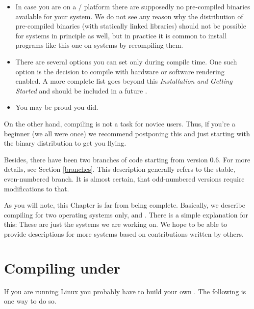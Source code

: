 \begin{itemize}
\item In case you are on a / platform there are supposedly no
pre-compiled binaries available for your system. We do not
see any reason why the distribution of pre-compiled binaries (with statically linked
libraries) should not be possible for  systems in principle as well, but in
practice it is common to install programs like this one on  systems by
recompiling them.

\item There are several options you can set only during
compile time. One such option is the decision to compile with
hardware or software  rendering enabled. A more
complete list goes beyond this \textit{Installation and Getting
Started} and should be included in a future
\textit{}.

\item You may be proud you did.
\end{itemize}

On the other hand, compiling \FlightGear is not a task for novice users. Thus, if you're
a beginner (we all were once) we recommend postponing this and just starting with the
binary distribution to get you flying.

Besides, there have been two branches of code starting from version 0.6. For more
details, see Section \ref{branches}. This description generally refers to the stable,
even-numbered branch. It is almost certain, that odd-numbered versions require
modifications to that.

As you will note, this Chapter is far from being complete. Basically, we describe
compiling for two operating systems only,  and . There
is a simple explanation for this: These are just the systems we are working on. We hope
to be able to provide descriptions for more systems based on contributions written by
others.

\section{Compiling under }

If you are running Linux you probably have to build your own
. The following is one way to do so.


